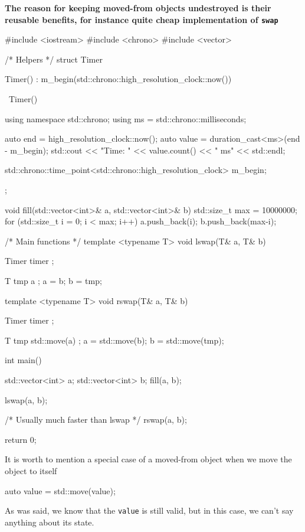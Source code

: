 \documentclass[../main]{subfiles}
\begin{document}
    \textbf{The reason for keeping moved-from objects undestroyed is
their reusable benefits, for instance quite cheap implementation of
\texttt{swap}}
\begin{Code}
    #include <iostream>
    #include <chrono>
    #include <vector>
    
    /* Helpers */
    struct Timer
    {
        Timer() : m_begin(std::chrono::high_resolution_clock::now())
        {
        }
    
        ~Timer()
        {
            using namespace std::chrono;
            using ms = std::chrono::milliseconds;
            
            auto end = high_resolution_clock::now();
            auto value = duration_cast<ms>(end - m_begin);
            std::cout << "Time: " << value.count() << " ms" << std::endl;
        }
    
        std::chrono::time_point<std::chrono::high_resolution_clock> m_begin;
    };
    
    void fill(std::vector<int>& a, std::vector<int>& b)
    {
        std::size_t max = 10000000;
        for (std::size_t i = 0; i < max; i++)
        {
            a.push_back(i);
            b.push_back(max-i);
        }
    }
    
    /* Main functions */
    template <typename T>
    void lswap(T& a, T& b)
    {
        Timer timer {};
    
        T tmp { a };
        a = b;
        b = tmp;
    }
    
    template <typename T>
    void rswap(T& a, T& b)
    {
        Timer timer {};
    
        T tmp { std::move(a) };
        a = std::move(b);
        b = std::move(tmp);
    }
    
    int main()
    {
        std::vector<int> a;
        std::vector<int> b;
        fill(a, b);
    
        lswap(a, b);
        
        /* Usually much faster than lswap */
        rswap(a, b);
    
        return 0;
    }
\end{Code}

    It is worth to mention a special case of a moved-from object
when we move the object to itself
\begin{Code}
    auto value = std::move(value);
\end{Code}
\noindent
As was said, we know that the \texttt{value} is still valid, but in this case, we can't say anything about its state.\newline
\end{document}
